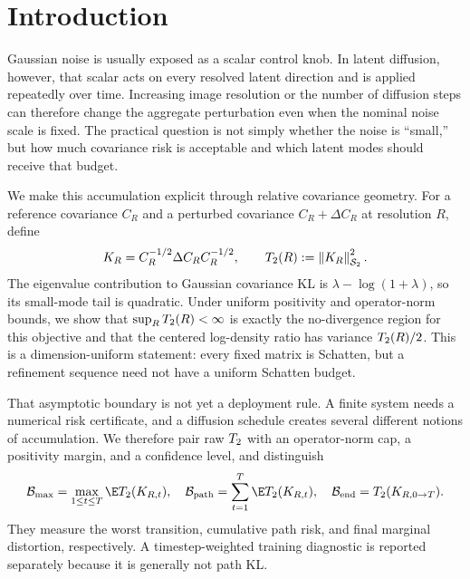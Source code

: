 \section{Introduction}
\label{sec:introduction}

Gaussian noise is usually exposed as a scalar control knob. In latent diffusion,
however, that scalar acts on every resolved latent direction and is applied
repeatedly over time. Increasing image resolution or the number of diffusion
steps can therefore change the aggregate perturbation even when the nominal
noise scale is fixed. The practical question is not simply whether the noise is
``small,'' but how much covariance risk is acceptable and which latent modes
should receive that budget.

We make this accumulation explicit through relative covariance geometry. For a
reference covariance $C_R$ and a perturbed covariance $C_R+\Delta C_R$ at
resolution $R$, define
\begin{equation}
  K_R=C_R^{-1/2}\Delta C_R C_R^{-1/2},
  \qquad
  T_2(R):=\left\lVert K_R \right\rVert_{\mathcal{S}_{2}}^{2}.
  \label{eq:relative-covariance-perturbation}
\end{equation}
The eigenvalue contribution to Gaussian covariance KL is
$\lambda-\log(1+\lambda)$, so its small-mode tail is quadratic. Under uniform
positivity and operator-norm bounds, we show that
$\sup_RT_2(R)<\infty$ is exactly the no-divergence region for this objective
and that the centered log-density ratio has variance $T_2(R)/2$. This is a
dimension-uniform statement: every fixed matrix is Schatten, but a refinement
sequence need not have a uniform Schatten budget.

That asymptotic boundary is not yet a deployment rule. A finite system needs a
numerical risk certificate, and a diffusion schedule creates several different
notions of accumulation. We therefore pair raw $T_2$ with an operator-norm
cap, a positivity margin, and a confidence level, and distinguish
\begin{equation}
  \mathcal B_{\max}=\max_{1\le t\le T}\E\Ttwo(K_{R,t}),\quad
  \mathcal B_{\mathrm{path}}=\sum_{t=1}^{T}\E\Ttwo(K_{R,t}),\quad
  \mathcal B_{\mathrm{end}}=\Ttwo(K_{R,0\rightarrow T}).
  \label{eq:finite-time-budgets-intro}
\end{equation}
They measure the worst transition, cumulative path risk, and final marginal
distortion, respectively. A timestep-weighted training diagnostic is reported
separately because it is generally not path KL.

